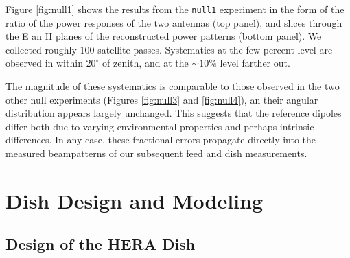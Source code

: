 \documentclass{emulateapj}
\begin{document}
Figure \ref{fig:null1} shows the results from the \texttt{null1} experiment in the form of the ratio of the power responses of the two antennas (top panel), and slices through the E an H planes of the reconstructed power patterns (bottom panel). We collected roughly 100 satellite passes. Systematics at the few percent level are observed in  within $20^\circ$ of zenith, and at the $\sim10\%$ level farther out.

The magnitude of these systematics is comparable to those observed in the two other null experiments (Figures \ref{fig:null3} and \ref{fig:null4}), an their angular distribution appears largely unchanged. This suggests that the reference dipoles differ both due to varying environmental properties and perhaps intrinsic differences. In any case, these fractional errors propagate directly into the measured beampatterns of our subsequent feed and dish measurements.  





\section{Dish Design and Modeling}

\subsection{Design of the HERA Dish}
\end{document}
